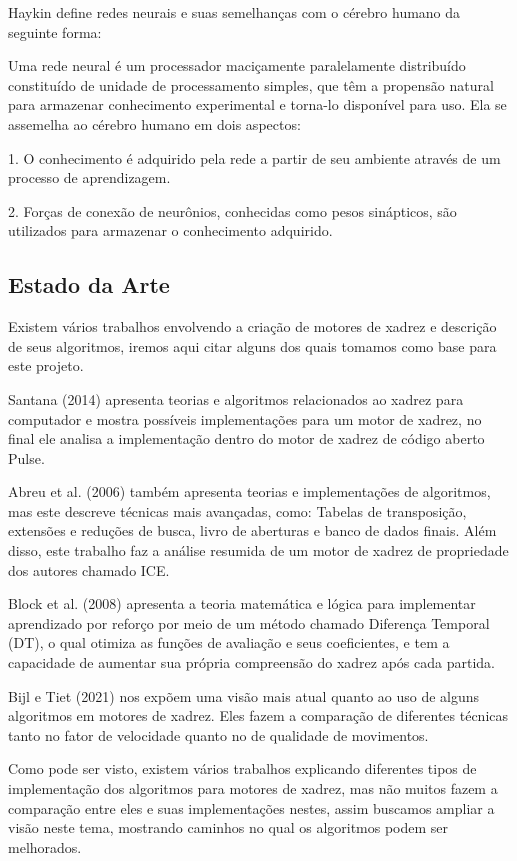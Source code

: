 Haykin define redes neurais e suas semelhanças com o cérebro humano da seguinte forma:

\begin{citacao}
    Uma rede neural é um processador maciçamente paralelamente distribuído constituído de unidade de processamento simples,
    que têm a propensão natural para armazenar conhecimento experimental e torna-lo disponível para uso. Ela se assemelha ao cérebro humano
    em dois aspectos:

    1. O conhecimento é adquirido pela rede a partir de seu ambiente através de um processo de aprendizagem.

    2. Forças de conexão de neurônios, conhecidas como pesos sinápticos, são utilizados para armazenar o conhecimento adquirido.
    \cite{HAYKIN}
\end{citacao}

\subsection{Estado da Arte}

Existem vários trabalhos envolvendo a criação de motores de xadrez e descrição de seus algoritmos, iremos aqui citar
alguns dos quais tomamos como base para este projeto.

Santana (2014) apresenta teorias e algoritmos relacionados ao xadrez para computador e mostra possíveis implementações
para um motor de xadrez, no final ele analisa a implementação dentro do motor de xadrez de código aberto Pulse.

Abreu et al. (2006) também apresenta teorias e implementações de algoritmos, mas este descreve técnicas mais avançadas,
como: Tabelas de transposição, extensões e reduções de busca, livro de aberturas e banco de dados finais. Além disso,
este trabalho faz a análise resumida de um motor de xadrez de propriedade dos autores chamado ICE.

Block et al. (2008) apresenta a teoria matemática e lógica para implementar aprendizado por reforço por meio de um
método chamado Diferença Temporal (DT), o qual otimiza as funções de avaliação e seus coeficientes, e tem a capacidade
de aumentar sua própria compreensão do xadrez após cada partida.

Bijl e Tiet (2021) nos expõem uma visão mais atual quanto ao uso de alguns algoritmos em motores de xadrez. Eles fazem
a comparação de diferentes técnicas tanto no fator de velocidade quanto no de qualidade de movimentos.

Como pode ser visto, existem vários trabalhos explicando diferentes tipos de implementação dos algoritmos para motores de xadrez,
mas não muitos fazem a comparação entre eles e suas implementações nestes, assim buscamos ampliar a visão neste tema, mostrando
caminhos no qual os algoritmos podem ser melhorados.
